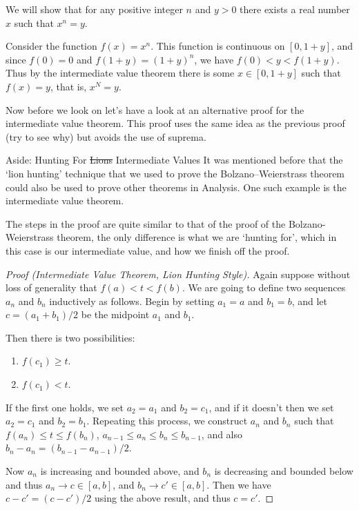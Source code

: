 \documentclass[a4paper]{scrartcl}
\begin{document}
\begin{example}
	We will show that for any positive integer $n$ and $y > 0$ there exists a real number $x$ such that $x^n = y$.

	Consider the function $f(x) = x^n$. This function is continuous on $[0, 1 + y]$, and since $f(0) = 0$ and $f(1 + y) = (1 + y)^n$, we have $f(0) < y < f(1 + y)$.
	Thus by the intermediate value theorem there is some $x \in [0, 1+ y]$ such that $f(x) = y$, that is, $x^N = y$.
\end{example}

Now before we look on let's have a look at an alternative proof for the intermediate value theorem. This proof uses the same idea as the previous proof (try to see why) but avoids the use of suprema.

\begin{aside}{Aside: Hunting For \st{Lions} Intermediate Values}
	It was mentioned before that the `lion hunting' technique that we used to prove the Bolzano–Weierstrass theorem could also be used to prove other theorems in Analysis. One such example is the intermediate value theorem.

	The steps in the proof are quite similar to that of the proof of the Bolzano-Weierstrass theorem, the only difference is what we are `hunting for', which in this case is our intermediate value, and how we finish off the proof.

	\begin{proof}[Proof (Intermediate Value Theorem, Lion Hunting Style)]
Again suppose without loss of generality that $f(a) < t < f(b)$.
We are going to define two sequences $a_n$ and $b_n$ inductively as follows. Begin by setting $a_1 = a$ and $b_1=b$, and let $c = (a_1 + b_1)/2$ be the midpoint $a_1$ and $b_1$.

Then there is two possibilities:
\begin{enumerate}
\item $f(c_1) \geq t$.
\item $f(c_1) < t$.
\end{enumerate}
If the first one holds, we set $a_2 = a_1$ and $b_2 = c_1$, and if it doesn't then we set $a_2 = c_1$ and $b_2 = b_1$.
Repeating this process, we construct $a_n$ and $b_n$ such that $f(a_n) \leq t \leq f(b_n)$, $a_{n - 1} \leq a_n \leq b_n \leq b_{n - 1}$, and also $b_n - a_n = (b_{n - 1} - a_{n - 1})/2$.

Now $a_n$ is increasing and bounded above, and $b_n$ is decreasing and bounded below and thus $a_n \rightarrow c \in [a, b]$, and $b_n \rightarrow c' \in [a, b]$. Then we have $c - c' = (c - c')/2$ using the above result, and thus $c = c'$.


\end{proof}
\end{aside}
\end{document}
